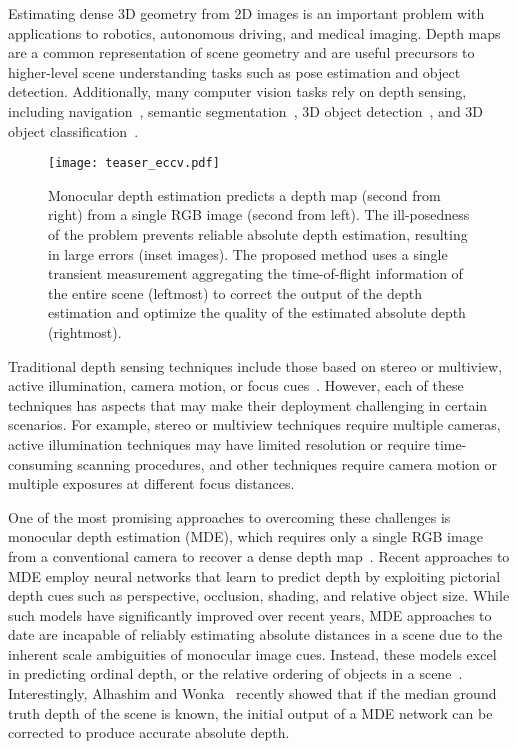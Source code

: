 Estimating dense 3D geometry from 2D images is an important problem with
applications to robotics, autonomous driving, and medical imaging. Depth maps
are a common representation of scene geometry and are useful precursors to
higher-level scene understanding tasks such as pose estimation and object
detection. Additionally, many computer vision tasks rely on depth sensing,
including navigation~\cite{geiger2013vision}, semantic
segmentation~\cite{gupta2013perceptual,ren2012rgb,silberman2012indoor}, 3D
object
detection~\cite{gupta2014learning,lin2013holistic,shrivastava2013building,song2014sliding,song2016deep},
and 3D object
classification~\cite{maturana2015voxnet,qi2016volumetric,wu20153d}.

\begin{figure}[t]
  \centering
  \texttt{[image: teaser\_eccv.pdf]}
  \caption{Monocular depth estimation predicts a depth map (second from right) from a
    single RGB image (second from left). The ill-posedness of the problem prevents
    reliable absolute depth estimation, resulting in large errors (inset images).
    The proposed method uses a single transient measurement aggregating
      the time-of-flight information of the entire scene (leftmost) to correct
    the output of the depth estimation and optimize the quality of the
    estimated absolute depth (rightmost).}
  \label{fig:teaser}
\end{figure}

Traditional depth sensing techniques include those based on stereo or multiview,
active illumination, camera motion, or focus cues~\cite{szeliski2010computer}.
However, each of these techniques has aspects that may make their deployment
challenging in certain scenarios. For example, stereo or multiview techniques require multiple
cameras, active illumination techniques may have limited resolution or require
time-consuming scanning procedures, and other techniques require camera motion
or multiple exposures at different focus distances.


One of the most promising approaches to overcoming these challenges is monocular
depth estimation (MDE), which requires only a single RGB image from a
conventional camera to recover a dense depth
map~\cite{Alhashim2018,Eigen2014,Fu2018,Laina2016,Saxena2006}. Recent approaches
to MDE employ neural networks that learn to predict depth by exploiting
pictorial depth cues such as perspective, occlusion, shading, and relative
object size. While such models have significantly improved over recent years,
MDE approaches to date are incapable of reliably estimating absolute distances
in a scene due to the inherent scale ambiguities of monocular image cues.
Instead, these models excel in predicting ordinal depth, or the relative
ordering of objects in a scene~\cite{Eigen2014,Fu2018}. Interestingly, Alhashim
and Wonka~\cite{Alhashim2018} recently showed that if the median ground truth
depth of the scene is known, the initial output of a MDE network can be
corrected to produce accurate absolute depth.



